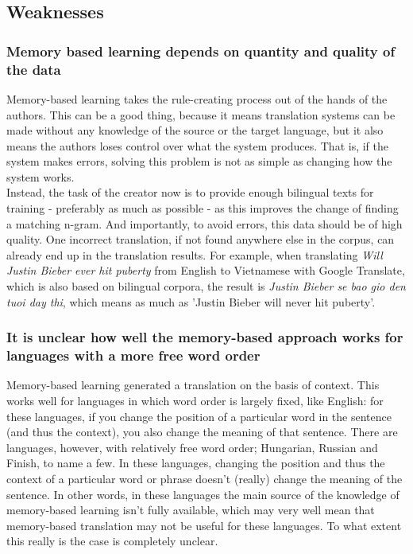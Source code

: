 \documentclass[12pt]{article}
\begin{document}
\subsection{Weaknesses}

\subsubsection{Memory based learning depends on quantity and quality of the data}

Memory-based learning takes the rule-creating process out of the hands of the authors. This can be a good thing, because it means translation systems can be made without any knowledge of the source or the target language, but it also means the authors loses control over what the system produces. That is, if the system makes errors, solving this problem is not as simple as changing how the system works. \\\indent
Instead, the task of the creator now is to provide enough bilingual texts for training - preferably as much as possible - as this improves the change of finding a matching n-gram. And importantly, to avoid errors, this data should be of high quality. One incorrect translation, if not found anywhere else in the corpus, can already end up in the translation results. For example, when translating \emph{Will Justin Bieber ever hit puberty} from English to Vietnamese with Google Translate, which is also based on bilingual corpora, the result is \emph{Justin Bieber se bao gio den tuoi day thi}, which means as much as 'Justin Bieber will never hit puberty'.

\subsubsection{It is unclear how well the memory-based approach works for languages with a more free word order}

Memory-based learning generated a translation on the basis of context. This works well for languages in which word order is largely fixed, like English: for these languages, if you change the position of a particular word in the sentence (and thus the context), you also change the meaning of that sentence. There are languages, however, with relatively free word order; Hungarian, Russian and Finish, to name a few. In these languages, changing the position and thus the context of a particular word or phrase doesn't (really) change the meaning of the sentence. In other words, in these languages the main source of the knowledge of memory-based learning isn't fully available, which may very well mean that memory-based translation may not be useful for these languages. To what extent this really is the case is completely unclear. \\\indent
\end{document}
